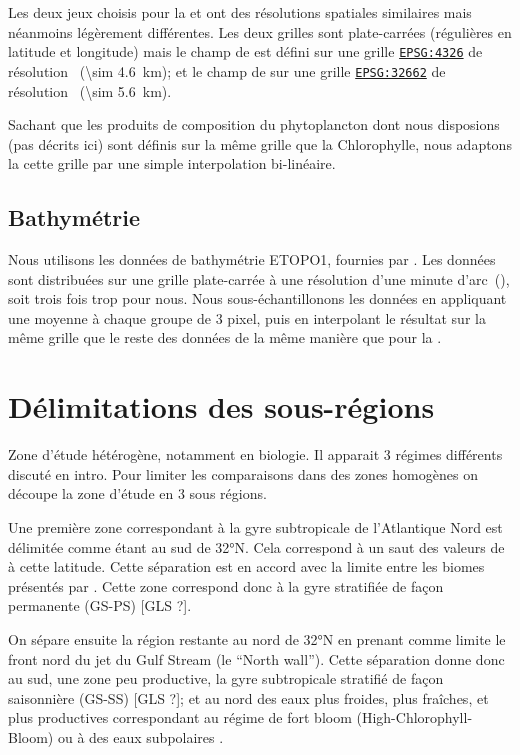 \documentclass[index]{subfiles}
\begin{document}
Les deux jeux choisis pour la  et  ont des résolutions spatiales similaires mais néanmoins légèrement différentes.
Les deux grilles sont plate-carrées (régulières en latitude et longitude) mais le champ de  est défini sur une grille \href{epsg.io/4326}{\texttt{EPSG:4326}} de résolution~ (\qty{\sim 4.6}{\km}); et le champ de  sur une grille \href{https://epsg.io/32662}{\texttt{EPSG:32662}} de résolution~ (\qty{\sim 5.6}{\km}).

Sachant que les produits de composition du phytoplancton dont nous disposions (pas décrits ici) sont définis sur la même grille que la Chlorophylle, nous adaptons la  cette grille par une simple interpolation bi-linéaire.

\subsection{Bathymétrie}
\label{sec:donnees-bathymetrie}

Nous utilisons les données de bathymétrie ETOPO1, fournies par .
Les données sont distribuées sur une grille plate-carrée à une résolution d'une minute d'arc~(), soit trois fois trop pour nous.
Nous sous-échantillonons les données en appliquant une moyenne à chaque groupe de 3 pixel, puis en interpolant le résultat sur la même grille que le reste des données de la même manière que pour la .

\section{Délimitations des sous-régions}
\label{sec:delimitations-regions}

Zone d'étude hétérogène, notamment en biologie.
Il apparait 3 régimes différents discuté en intro.
Pour limiter les comparaisons dans des zones homogènes on découpe la zone d'étude en 3 sous régions.

Une première zone correspondant à la gyre subtropicale de l'Atlantique Nord est délimitée comme étant au sud de \ang{32}N.
Cela correspond à un saut des valeurs de  à cette latitude.
Cette séparation est en accord avec la limite entre les biomes présentés par \textcite{sarmiento_2004}.
Cette zone correspond donc à la gyre stratifiée de façon permanente (GS-PS) [GLS ?].

On sépare ensuite la région restante au nord de \ang{32}N en prenant comme limite le front nord du jet du Gulf Stream (le \enquote{North wall}). Cette séparation donne donc au sud, une zone peu productive, la gyre subtropicale stratifié de façon saisonnière (GS-SS) [GLS ?]; et au nord des eaux plus froides, plus fraîches, et plus productives correspondant au régime de fort bloom (High-Chlorophyll-Bloom) \parencite{sarmiento_2004} ou à des eaux subpolaires \parencite{bock_2022}.
\end{document}
